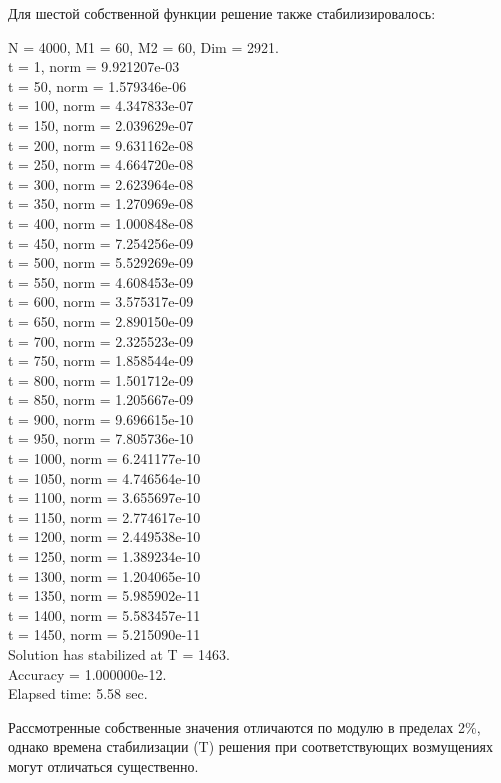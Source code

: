 \documentclass[12pt,a4paper]{article}
\begin{document}
Для шестой собственной функции решение также стабилизировалось:
\begin{center}
N = 4000, M1 =  60, M2 =  60, Dim =   2921. \\
t =   1, norm = 9.921207e-03 \\
t =  50, norm = 1.579346e-06 \\
t = 100, norm = 4.347833e-07 \\
t = 150, norm = 2.039629e-07 \\
t = 200, norm = 9.631162e-08 \\
t = 250, norm = 4.664720e-08 \\
t = 300, norm = 2.623964e-08 \\
t = 350, norm = 1.270969e-08 \\
t = 400, norm = 1.000848e-08 \\
t = 450, norm = 7.254256e-09 \\
t = 500, norm = 5.529269e-09 \\
t = 550, norm = 4.608453e-09 \\
t = 600, norm = 3.575317e-09 \\
t = 650, norm = 2.890150e-09 \\
t = 700, norm = 2.325523e-09 \\
t = 750, norm = 1.858544e-09 \\
t = 800, norm = 1.501712e-09 \\
t = 850, norm = 1.205667e-09 \\
t = 900, norm = 9.696615e-10 \\
t = 950, norm = 7.805736e-10 \\
t = 1000, norm = 6.241177e-10 \\
t = 1050, norm = 4.746564e-10 \\
t = 1100, norm = 3.655697e-10 \\
t = 1150, norm = 2.774617e-10 \\
t = 1200, norm = 2.449538e-10 \\
t = 1250, norm = 1.389234e-10 \\
t = 1300, norm = 1.204065e-10 \\
t = 1350, norm = 5.985902e-11 \\
t = 1400, norm = 5.583457e-11 \\
t = 1450, norm = 5.215090e-11 \\
Solution has stabilized at T = 1463. \\
Accuracy = 1.000000e-12. \\
Elapsed time: 5.58 sec.
\end{center}

Рассмотренные собственные значения отличаются по модулю в пределах 2\%, однако времена стабилизации (T) решения при соответствующих возмущениях могут отличаться существенно.
\end{document}
